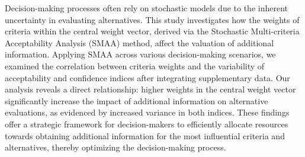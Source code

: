 
\begin{Abstrakt}
    Decision-making processes often rely on stochastic models due to the inherent uncertainty in evaluating alternatives. This study investigates how the weights of criteria within the central weight vector, derived via the Stochastic Multi-criteria Acceptability Analysis (SMAA) method, affect the valuation of additional information. Applying SMAA across various decision-making scenarios, we examined the correlation between criteria weights and the variability of acceptability and confidence indices after integrating supplementary data. Our analysis reveals a direct relationship: higher weights in the central weight vector significantly increase the impact of additional information on alternative evaluations, as evidenced by increased variance in both indices. These findings offer a strategic framework for decision-makers to efficiently allocate resources towards obtaining additional information for the most influential criteria and alternatives, thereby optimizing the decision-making process.
\end{Abstrakt}



\clearpage